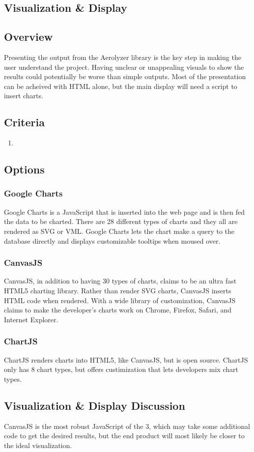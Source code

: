 \documentclass[onecolumn, draftclsnofoot,10pt, compsoc]{IEEEtran}
\begin{document}
\begin{singlespace}
\section{Visualization \& Display}
\subsection{Overview}
Presenting the output from the Aerolyzer library is the key step in making the user understand the project.
Having unclear or unappealing visuals to show the results could potentially be worse than simple outputs.
Most of the presentation can be acheived with HTML alone, but the main display will need a script to insert charts.
\subsection{Criteria}
\begin{enumerate}
\item
\end{enumerate}
\subsection{Options}
\subsubsection{Google Charts}
Google Charts is a JavaScript that is inserted into the web page and is then fed the data to be charted.
There are 28 different types of charts and they all are rendered as SVG or VML.
Google Charts lets the chart make a query to the database directly and displays customizable tooltips when moused over.
\subsubsection{CanvasJS}
CanvasJS, in addition to having 30 types of charts, claims to be an ultra fast HTML5 charting library.
Rather than render SVG charts, CanvasJS inserts HTML code when rendered.
With a wide library of customization, CanvasJS claims to make the developer's charts work on Chrome, Firefox, Safari, and Internet Explorer.
\subsubsection{ChartJS}
ChartJS renders charts into HTML5, like CanvasJS, but is open source.
ChartJS only has 8 chart types, but offers custimization that lets developers mix chart types.
\subsection{Visualization \& Display Discussion}
CanvasJS is the most robust JavaScript of the 3, which may take some additional code to get the desired results, but the end product will most likely be closer to the ideal visualization. 

\end{singlespace}
\end{document}
